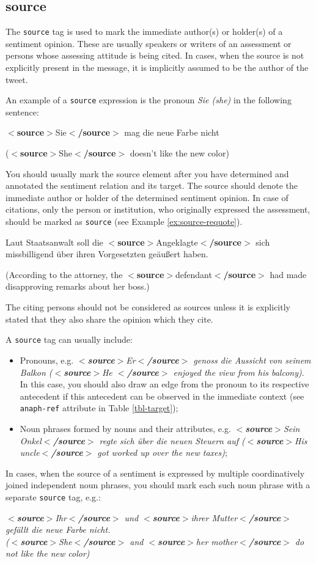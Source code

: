 \documentclass[11pt,a4paper]{article}
\newcommand{\xmltag}[1]{{\textbf{\small$<$#1$>$}}}
\newcommand{\source}[1]{\xmltag{source}#1\xmltag{/source}}
\newenvironment{myexe}{
  \begin{exe}
    \ex\begin{center}
    \itshape
}{
    \end{center}
  \end{exe}
}
\begin{document}
\subsection{source}
The \texttt{source} tag is used to mark the immediate author(s) or
holder(s) of a sentiment opinion.  These are usually speakers or
writers of an assessment or persons whose assessing attitude is being
cited.  In cases, when the source is not explicitly present in the
message, it is implicitly assumed to be the author of the tweet.

An example of a \texttt{source} expression is the pronoun \textit{Sie
  (she)} in the following sentence:
\begin{myexe}
  \source{Sie} mag die neue Farbe nicht

  (\source{She} doesn't like the new color)
\end{myexe}

You should usually mark the source element after you have determined and
annotated the sentiment relation and its target.  The source should denote the
immediate author or holder of the determined sentiment opinion.  In case of
citations, only the person or institution, who originally expressed the
assessment, should be marked as \texttt{source} (see Example
\ref{ex:source-requote}).
\begin{myexe}
  Laut Staatsanwalt soll die \source{Angeklagte} sich missbilligend \"uber
  ihren Vorgesetzten ge\"au\ss{}ert haben.

  (According to the attorney, the \source{defendant} had made disapproving
  remarks about her boss.)\label{ex:source-requote}
\end{myexe}
The citing persons should not be considered as sources unless it is explicitly
stated that they also share the opinion which they cite.

A \texttt{source} tag can usually include:
\begin{itemize}
  \item Pronouns, e.g. \textit{\source{Er} genoss die Aussicht von seinem
    Balkon (\source{He } enjoyed the view from his balcony)}.  In this case,
    you should also draw an edge from the pronoun to its respective antecedent
    if this antecedent can be observed in the immediate context (see
    \texttt{anaph-ref} attribute in Table \ref{tbl-target});

  \item Noun phrases formed by nouns and their attributes,
    e.g. \textit{\source{Sein Onkel} regte sich \"uber die neuen Steuern auf
      (\source{His uncle} got worked up over the new taxes)};
\end{itemize}
In cases, when the source of a sentiment is expressed by multiple
coordinatively joined independent noun phrases, you should mark each such noun
phrase with a separate \texttt{source} tag, e.g.:
\begin{myexe}\label{ex:2source}
  \source{Ihr} und \source{ihrer Mutter} gef\"allt die neue Farbe
  nicht.\\ (\source{She} and \source{her mother} do not like the new
  color)
\end{myexe}
\end{document}

